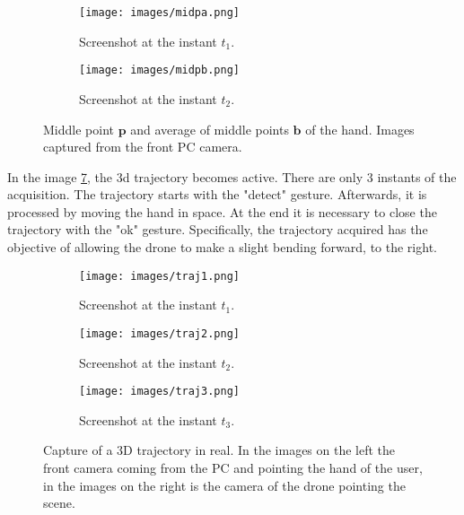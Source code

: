\begin{figure}[H]
    \centering
    \begin{subfigure}[b]{0.49 \textwidth}
        \centering
        \texttt{[image: images/midpa.png]}
        \caption[]{Screenshot at the instant $t_1$.}
        \label{fig:midpa}
    \end{subfigure}
    \hfill
    \begin{subfigure}[b]{0.49 \textwidth}
        \centering
        \texttt{[image: images/midpb.png]}
        \caption[]{Screenshot at the instant $t_2$.}
        \label{fig:midpb}
    \end{subfigure}
    \caption[Middle point p and average of middle points b of the hand.]{Middle point $\bm{p}$ and average of middle points $\bm{b}$ of the hand. Images captured from the front PC camera.}
    \label{fig:midp}
\end{figure}

\noindent In the image \ref{fig:traj}, the \gls{3d} trajectory becomes active. There are only $3$ instants of the acquisition. The trajectory starts with the "detect" gesture. Afterwards, it is processed by moving the hand in space. At the end it is necessary to close the trajectory with the "ok" gesture. Specifically, the trajectory acquired has the objective of allowing the drone to make a slight bending forward, to the right. \\

\begin{figure}
    \centering
    \begin{subfigure}[b]{0.7 \textwidth}
        \centering
        \texttt{[image: images/traj1.png]}
        \caption[]{Screenshot at the instant $t_1$.}
        \label{fig:traj1}
    \end{subfigure}
    \hfill
    \begin{subfigure}[b]{0.7 \textwidth}
        \centering
        \texttt{[image: images/traj2.png]}
        \caption[]{Screenshot at the instant $t_2$.}
        \label{fig:traj2}
    \end{subfigure}
    \hfill
    \begin{subfigure}[b]{0.7 \textwidth}
        \centering
        \texttt{[image: images/traj3.png]}
        \caption[]{Screenshot at the instant $t_3$.}
        \label{fig:traj3}
    \end{subfigure}
    \caption[Capture of a 3D trajectory in real.]{Capture of a 3D trajectory in real. In the images on the left the front camera coming from the PC and pointing the hand of the user, in the images on the right is the camera of the drone pointing the scene.}
    \label{fig:traj}
\end{figure}

